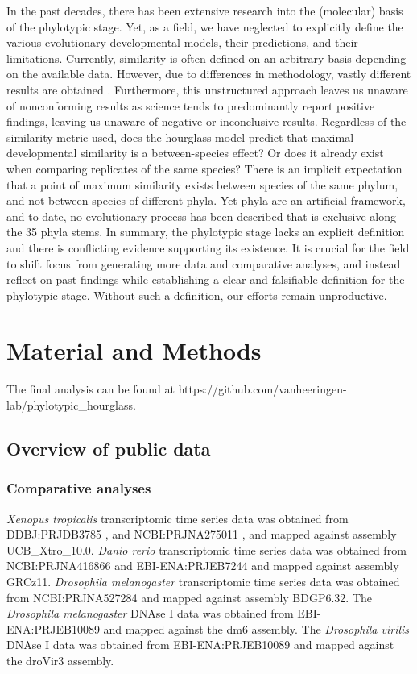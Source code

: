 In the past decades, there has been extensive research into the (molecular) basis of the phylotypic stage. Yet, as a field, we have neglected to explicitly define the various evolutionary-developmental models, their predictions, and their limitations. Currently, similarity is often defined on an arbitrary basis depending on the available data. However,  due to differences in methodology, vastly different results are obtained  \cite{Piasecka2013,Dunn2018,Chan2021}. Furthermore, this unstructured approach leaves us unaware of nonconforming results as science tends to predominantly report positive findings, leaving us unaware of negative or inconclusive results. Regardless of the similarity metric used, does the hourglass model predict that maximal developmental similarity is a between-species effect? Or does it already exist when comparing replicates of the same species? There is an implicit expectation that a point of maximum similarity exists between species of the same phylum, and not between species of different phyla. Yet phyla are an artificial framework, and to date, no evolutionary process has been described that is exclusive along the 35 phyla stems\cite{hejnol2016}. In summary, the phylotypic stage lacks an explicit definition and there is conflicting evidence supporting its existence. It is crucial for the field to shift focus from generating more data and comparative analyses, and instead reflect on past findings while establishing a clear and falsifiable definition for the phylotypic stage. Without such a definition, our efforts remain unproductive.

\section{Material and Methods}

The final analysis can be found at https://github.com/vanheeringen-lab/phylotypic\_hourglass.

\subsection{Overview of public data}

\subsubsection{Comparative analyses}

\textit{Xenopus tropicalis} transcriptomic time series data was obtained from DDBJ:PRJDB3785 \cite{Hu2017}, and NCBI:PRJNA275011 \cite{Owens2016}, and mapped against assembly UCB\_Xtro\_10.0. \textit{Danio rerio} transcriptomic time series data was obtained from NCBI:PRJNA416866 \cite{marletaz2018} and EBI-ENA:PRJEB7244 \cite{White2017} and mapped against assembly GRCz11. \textit{Drosophila melanogaster} transcriptomic time series data was obtained from NCBI:PRJNA527284 \cite{Liu2021} and mapped against assembly BDGP6.32. The \textit{Drosophila melanogaster} DNAse I data was obtained from EBI-ENA:PRJEB10089 \cite{Liu2020} and mapped against the dm6 assembly. The \textit{Drosophila virilis} DNAse I data was obtained from EBI-ENA:PRJEB10089 \cite{Liu2020} and mapped against the droVir3 assembly.

